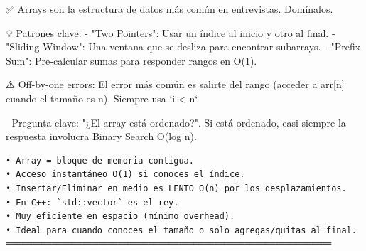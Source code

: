 \begin{dsaentrevistas}

✅ Arrays son la estructura de datos más común en entrevistas. Domínalos.

💡 Patrones clave:
   - "Two Pointers": Usar un índice al inicio y otro al final.
   - "Sliding Window": Una ventana que se desliza para encontrar subarrays.
   - "Prefix Sum": Pre-calcular sumas para responder rangos en O(1).

⚠️ Off-by-one errors: El error más común es salirte del rango (acceder
   a arr[n] cuando el tamaño es n). Siempre usa `i < n`.

🔑 Pregunta clave: "¿El array está ordenado?". Si está ordenado, casi
   siempre la respuesta involucra Binary Search O(log n).

\end{dsaentrevistas}

\begin{lstlisting}
• Array = bloque de memoria contigua.
• Acceso instantáneo O(1) si conoces el índice.
• Insertar/Eliminar en medio es LENTO O(n) por los desplazamientos.
• En C++: `std::vector` es el rey.
• Muy eficiente en espacio (mínimo overhead).
• Ideal para cuando conoces el tamaño o solo agregas/quitas al final.
════════════════════════════════════════════════════════════════
\end{lstlisting}


